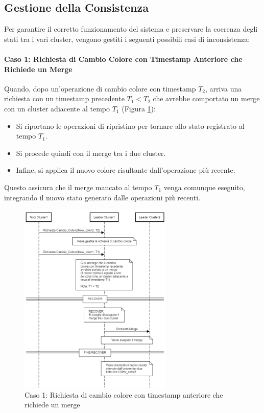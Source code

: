 \documentclass[12pt, a4paper]{report}
\begin{document}
\newpage
\subsection{Gestione della Consistenza}\label{sec:gestione_consistenza}

Per garantire il corretto funzionamento del sistema e preservare la coerenza degli stati tra i vari cluster, vengono gestiti i seguenti possibili casi di inconsistenza:

\paragraph{Caso 1: Richiesta di Cambio Colore con Timestamp Anteriore che Richiede un Merge}\label{par:case1}

Quando, dopo un'operazione di cambio colore con timestamp $T_2$, arriva una richiesta con un timestamp precedente $T_1 < T_2$ che avrebbe comportato un merge con un cluster adiacente al tempo $T_1$ (Figura \ref{fig:caso1_concorrenza}):

\begin{itemize}
    \item Si riportano le operazioni di ripristino per tornare allo stato registrato al tempo $T_1$.
    \item Si procede quindi con il merge tra i due cluster.
    \item Infine, si applica il nuovo colore risultante dall'operazione più recente.
\end{itemize}

Questo assicura che il merge mancato al tempo $T_1$ venga comunque eseguito, integrando il nuovo stato generato dalle operazioni più recenti.

\begin{figure}[H]
    \centering
    \includegraphics[width=0.65\textwidth,align=t]{images/concorrenza/caso1.png}
    \caption{Caso 1: Richiesta di cambio colore con timestamp anteriore che richiede un merge}
    \label{fig:caso1_concorrenza}
\end{figure}
\end{document}
